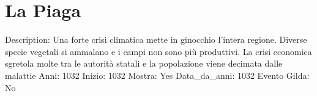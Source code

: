 \section{La Piaga}\label{la-piaga}

Description: Una forte crisi climatica mette in ginocchio l'intera
regione. Diverse specie vegetali si ammalano e i campi non sono più
produttivi. La crisi economica sgretola molte tra le autorità statali e
la popolazione viene decimata dalle malattie Anni: 1032 Inizio: 1032
Mostra: Yes Data\_da\_anni: 1032 Evento Gilda: No
